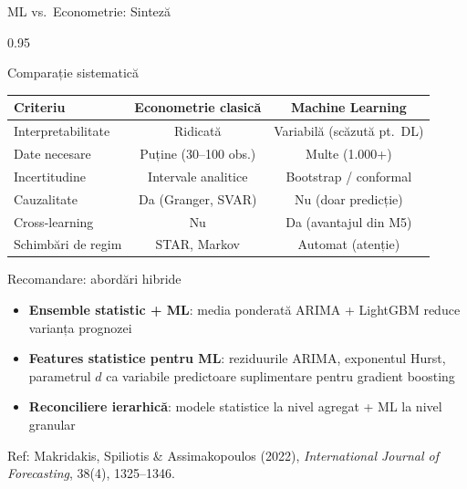 \documentclass[9pt, aspectratio=169, t]{beamer}
\begin{document}
\begin{frame}{ML vs.\ Econometrie: Sinteză}
    \vspace{-2mm}
    \begin{cminipage}{0.95\textwidth}
        {\scriptsize
        \begin{block}{Comparație sistematică}
            \begin{center}
            \begin{tabular}{l|c|c}
                \toprule
                \textbf{Criteriu} & \textbf{Econometrie clasică} & \textbf{Machine Learning} \\
                \midrule
                Interpretabilitate & Ridicată & Variabilă (scăzută pt.\ DL) \\
                Date necesare & Puține (30--100 obs.) & Multe (1.000+) \\
                Incertitudine & Intervale analitice & Bootstrap / conformal \\
                Cauzalitate & Da (Granger, SVAR) & Nu (doar predicție) \\
                Cross-learning & Nu & Da (avantajul din M5) \\
                Schimbări de regim & STAR, Markov & Automat (atenție) \\
                \bottomrule
            \end{tabular}
            \end{center}
        \end{block}
        \vspace{-2mm}
        \begin{exampleblock}{Recomandare: abordări hibride}
            \begin{itemize}\setlength{\itemsep}{1pt}
                \item \textbf{Ensemble statistic + ML}: media ponderată ARIMA + LightGBM reduce varianța prognozei
                \item \textbf{Features statistice pentru ML}: reziduurile ARIMA, exponentul Hurst, parametrul $d$ ca variabile predictoare suplimentare pentru gradient boosting
                \item \textbf{Reconciliere ierarhică}: modele statistice la nivel agregat + ML la nivel granular
            \end{itemize}
        \end{exampleblock}
        \vspace{-1mm}
        {\tiny Ref: Makridakis, Spiliotis \& Assimakopoulos (2022), \textit{International Journal of Forecasting}, 38(4), 1325--1346.}
        }
    \end{cminipage}
\end{frame}
\end{document}
